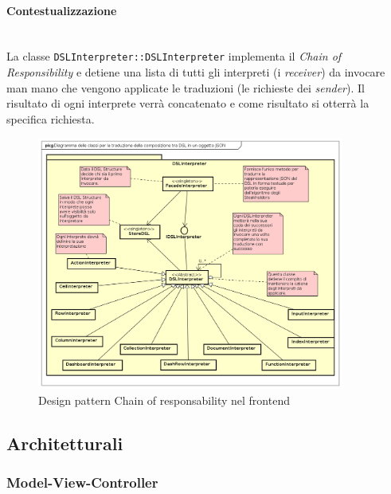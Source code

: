 \paragraph{Contestualizzazione}\mbox{} \\
La classe \texttt{DSLInterpreter::DSLInterpreter} implementa il \textit{Chain of Responsibility} e detiene una lista di tutti gli interpreti (i \textit{receiver}) da invocare man mano che vengono applicate le traduzioni (le richieste dei \textit{sender}). Il risultato di ogni interprete verrà concatenato e come risultato si otterrà la specifica  richiesta.
\begin{figure}[H]
\centering
\includegraphics[width=0.9\textwidth]{res/sections/frontend/chainOfResponsability.png}
\caption{Design pattern Chain of responsability nel frontend}
\end{figure}
\subsection{Architetturali}
\subsubsection{Model-View-Controller}
